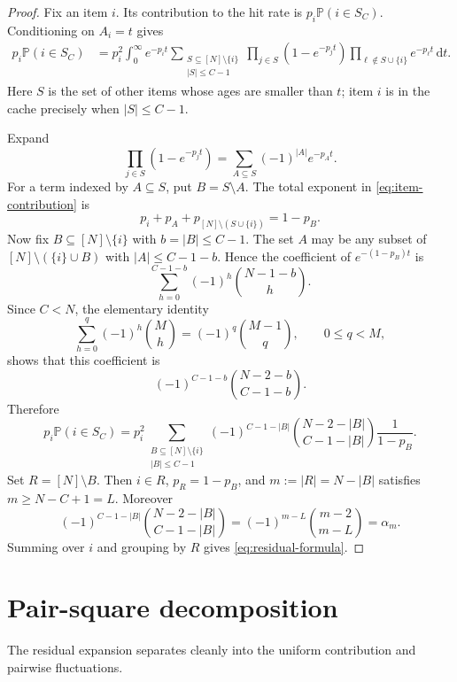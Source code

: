 \documentclass[11pt]{article}
\theoremstyle{remark}
\newcommand{\dd}{\,\mathrm{d}}
\newcommand{\Pp}{\mathbb{P}}
\newcommand{\card}[1]{\lvert #1\rvert}
\begin{document}
\begin{proof}
Fix an item $i$.  Its contribution to the hit rate is $p_i\Pp(i\in S_C)$.
Conditioning on $A_i=t$ gives
\begin{align}
        p_i\Pp(i\in S_C)
        & =
        p_i^2\int_0^\infty e^{-p_i t}
        \sum_{\substack{S\subseteq [N]\setminus\{i\}\\ \card S\le C-1}}
        \prod_{j\in S}(1-e^{-p_jt})
        \prod_{\ell\notin S\cup\{i\}}e^{-p_\ell t}
        \dd t.
        \label{eq:item-contribution}
\end{align}
Here $S$ is the set of other items whose ages are smaller than $t$; item
$i$ is in the cache precisely when $\card S\le C-1$.

Expand
\[
        \prod_{j\in S}(1-e^{-p_jt})
        =
        \sum_{A\subseteq S}(-1)^{\card A}e^{-p_A t}.
\]
For a term indexed by $A\subseteq S$, put $B=S\setminus A$.  The total
exponent in \eqref{eq:item-contribution} is
\[
        p_i+p_A+p_{[N]\setminus(S\cup\{i\})}=1-p_B.
\]
Now fix $B\subseteq [N]\setminus\{i\}$ with $b=\card B\le C-1$.  The set
$A$ may be any subset of $[N]\setminus(\{i\}\cup B)$ with
$\card A\le C-1-b$.  Hence the coefficient of $e^{-(1-p_B)t}$ is
\[
        \sum_{h=0}^{C-1-b}(-1)^h\binom{N-1-b}{h}.
\]
Since $C<N$, the elementary identity
\[
        \sum_{h=0}^q(-1)^h\binom{M}{h}
        =(-1)^q\binom{M-1}{q},
        \qquad 0\le q<M,
\]
shows that this coefficient is
\[
        (-1)^{C-1-b}\binom{N-2-b}{C-1-b}.
\]
Therefore
\[
        p_i\Pp(i\in S_C)
        =
        p_i^2
        \sum_{\substack{B\subseteq[N]\setminus\{i\}\\ \card B\le C-1}}
        (-1)^{C-1-\card B}
        \binom{N-2-\card B}{C-1-\card B}
        \frac{1}{1-p_B}.
\]
Set $R=[N]\setminus B$.  Then $i\in R$, $p_R=1-p_B$, and
$m:=\card R=N-\card B$ satisfies $m\ge N-C+1=L$.  Moreover
\[
        (-1)^{C-1-\card B}
        \binom{N-2-\card B}{C-1-\card B}
        =
        (-1)^{m-L}\binom{m-2}{m-L}=\alpha_m.
\]
Summing over $i$ and grouping by $R$ gives \eqref{eq:residual-formula}.
\end{proof}

\section{Pair-square decomposition}

The residual expansion separates cleanly into the uniform contribution
and pairwise fluctuations.
\end{document}
